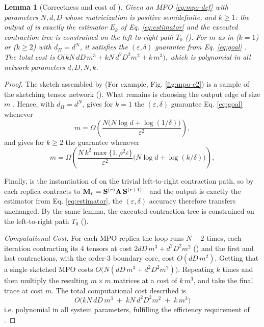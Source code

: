 \documentclass[11pt]{article}
\theoremstyle{plain}
\newtheorem{lemma}[theorem]{Lemma}
\theoremstyle{definition}
\theoremstyle{remark}
\begin{document}
\begin{lemma}[Correctness and cost of ]\label{lem:mpop-correct}
Given an MPO \eqref{eq:mpo-def} with parameters $N,d,D$ whose matricization is
positive semidefinite, and $k\ge1$: the output of  is exactly
the estimator $E_k$ of Eq. \eqref{eq:estimator} and the executed contraction tree is constrained on the
left-to-right path $T_0$ (). For $m$ as in
 ($k=1$) or  ($k\ge2$) with
$d_{\Pi}=d^{N}$, it satisfies the $(\varepsilon,\delta)$ guarantee
from Eq. \eqref{eq:goal} . \\
The total cost is $O\!\bigl(kN\,dD\,m^{3}+kN\,d^{2}D^{2}m^{2}+k\,m^{3}\bigr)$, which is polynomial in all network parameters $d,D,N,k$.
\end{lemma}
\begin{proof}The sketch assembled by  (For example, Fig. \ref{fig:mpo-e2}) is a sample of the sketching tensor network ().
What remains is choosing the output edge of size $m$ .
Hence, with $d_{\Pi}=d^{N}$,  gives for $k=1$ the $(\varepsilon,\delta)$ guarantee Eq. \eqref{eq:goal}
whenever
\[
  m=\Omega\!\left(\frac{N\bigl(N\log d+\log(1/\delta)\bigr)}
    {\varepsilon^{2}}\right),
\]
and  gives for $k\ge2$ the guarantee whenever
\[
m=\Omega\!\left(\frac{N\,k^{2}\max\{1,\rho^{2}\varepsilon\}}
    {\varepsilon^{2}}\bigl(N\log d+\log(k/\delta)\bigr)\right),
\]

Finally,  is the instantiation of  on the
trivial left-to-right contraction path, so by  each
replica contracts to $\mathbf{M}_r=\mathbf{S}^{(r)}\mathbf{A}\,\mathbf{S}^{(r+1)\top}$ and the output is exactly the estimator from Eq. \eqref{eq:estimator}, the
$(\varepsilon,\delta)$ accuracy therefore transfers unchanged. 
By the same lemma, the executed contraction tree is constrained on the
left-to-right path $T_0$ ().
\leanok
{}


\medskip\noindent\emph{Computational Cost.}
For each MPO replica the loop runs $N-2$ times, each iteration contracting
its 4 tensors at cost $2dD\,m^{3}+d^{2}D^{2}m^{2}$
() and the first and last contractions, with the order-$3$
boundary core, cost $O(dD\,m^{2})$. Getting that a
single sketched MPO costs $O\!\bigl(N(dD\,m^{3}+d^{2}D^{2}m^{2})\bigr)$.
Repeating $k$ times and then multiply the resulting $m\times m$ matrices at a
cost of $k\,m^{3}$, and take the final trace at cost $m$. The total computational cost described is $$O\!\bigl(kN\,dD\,m^{3}\;+\;kN\,d^{2}D^{2}m^{2}\;+\;k\,m^{3}\bigr)$$
i.e. polynomial in all system parameters, fulfilling the efficiency
requirement of .
\end{proof}
\end{document}
